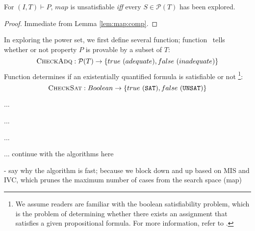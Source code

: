 \begin{lemma}
\label{lem:map:cc}
For $(I, T) \vdash P$, $map$ is unsatisfiable \emph{iff} every $S \in \mathcal{P}(T)$ has been explored.
\end{lemma}
\begin{proof}
Immediate from Lemma \ref{lem:map:comp}.
\end{proof}


In exploring the power set,
we first define several function; function \isadeq ~tells whether or not property $P$ is provable by a subset of $T$:
$$\textsc{CheckAdq} : \mathcal{P}(T) \rightarrow \{true~(adequate), false~(inadequate)\}$$
\noindent Function \checksat determines if an
existentially quantified formula is satisfiable or not
\footnote{We assume readers are familiar with the boolean satisfiability problem, which is the problem of determining whether there exists an assignment that satisfies a given propositional formula. For more information, refer to \cite{cook1971complexity}.}:
$$\textsc{CheckSat} : Boolean \rightarrow \{ true~(\texttt{SAT}), false~(\texttt{UNSAT}) \}$$


\getivc ...

\blockup ...

\blockdown ...

... continue with the algorithms here

- say why the algorithm is fast; because we block down and up based on MIS and IVC, which prunes the maximum number of cases from the search space (map)




